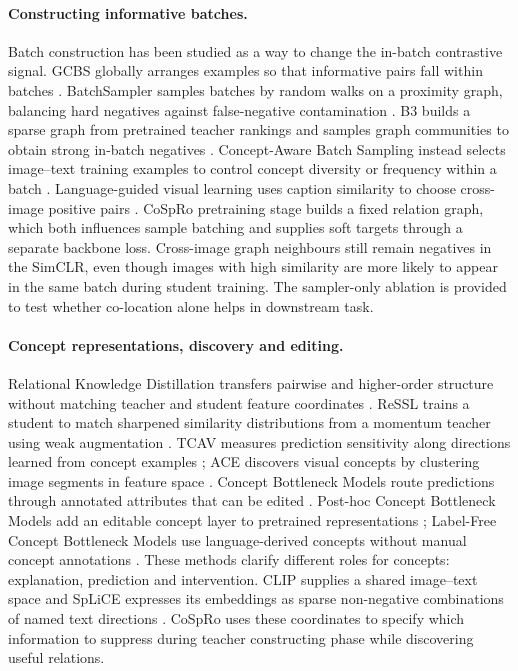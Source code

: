 \documentclass{article}
\begin{document}
\paragraph{Constructing informative batches.}
Batch construction has been studied as a way to change the in-batch contrastive signal. GCBS globally arranges examples so that informative pairs fall within batches \citep{sachidananda2023gcbs}. BatchSampler samples batches by random walks on a proximity graph, balancing hard negatives against false-negative contamination \citep{yang2023batchsampler}. B3 builds a sparse graph from pretrained teacher rankings and samples graph communities to obtain strong in-batch negatives \citep{thirukovalluru2025b3}. Concept-Aware Batch Sampling instead selects image--text training examples to control concept diversity or frequency within a batch \citep{ghosh2026cabs}. Language-guided visual learning uses caption similarity to choose cross-image positive pairs \citep{elbanani2023language}. CoSpRo pretraining stage builds a fixed relation graph, which both influences sample batching and supplies soft targets through a separate backbone loss. Cross-image graph neighbours still remain negatives in the SimCLR, even though images with high similarity are more likely to appear in the same batch during student training. The sampler-only ablation is provided to test whether co-location alone helps in downstream task.

\paragraph{Concept representations, discovery and editing.}
Relational Knowledge Distillation transfers pairwise and higher-order structure without matching teacher and student feature coordinates \citep{park2019rkd}. ReSSL trains a student to match sharpened similarity distributions from a momentum teacher using weak augmentation \citep{zheng2021ressl}.
TCAV measures prediction sensitivity along directions learned from concept examples \citep{kim2018tcav}; ACE discovers visual concepts by clustering image segments in feature space \citep{ghorbani2019ace}. Concept Bottleneck Models route predictions through annotated attributes that can be edited \citep{koh2020cbm}. Post-hoc Concept Bottleneck Models add an editable concept layer to pretrained representations \citep{yuksekgonul2023pcb}; Label-Free Concept Bottleneck Models use language-derived concepts without manual concept annotations \citep{oikarinen2023lfcbm}. These methods clarify different roles for concepts: explanation, prediction and intervention. CLIP supplies a shared image--text space \citep{radford2021clip} and SpLiCE expresses its embeddings as sparse non-negative combinations of named text directions \citep{bhalla2024splice}. CoSpRo uses these coordinates to specify which information to suppress during teacher constructing phase while discovering useful relations. 
\end{document}
